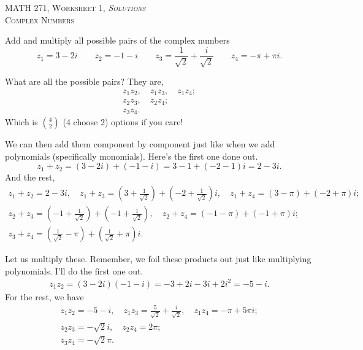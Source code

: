 \documentclass[12pt]{article} %
\begin{document}
\begin{center}
   \textsc{\large MATH 271, Worksheet 1, \emph{Solutions}}\\
   \textsc{Complex Numbers}
\end{center}
\vspace{.5cm}

\begin{problem}
Add and multiply all possible pairs of the complex numbers
\[
z_1 = 3-2i \qquad z_2 = -1-i \qquad z_3 = \frac{1}{\sqrt{2}}+\frac{i}{\sqrt{2}} \qquad z_4 = -\pi + \pi i.
\]
\end{problem}
\begin{solution}
What are all the possible pairs? They are,
\begin{align*}
    z_1 z_2, \quad z_1 z_3, \quad z_1 z_4;\\
    z_2 z_3, \quad z_2 z_4;\\
    z_3 z_4.
\end{align*}
Which is $\binom{4}{2}$ (4 choose 2) options if you care!

We can then add them component by component just like when we add polynomials (specifically monomials). Here's the first one done out.
\[
z_1+z_2=(3-2i)+(-1-i)=3-1+(-2-1)i=2-3i.
\]
And the rest,
\begin{align*}
    z_1 + z_2=2-3i, \quad z_1 + z_3=\left(3+\frac{1}{\sqrt{2}}\right)+\left(-2+\frac{1}{\sqrt{2}}\right)i, \quad z_1 + z_4=(3-\pi)+(-2+\pi)i;\\
    z_2+ z_3= \left(-1+\frac{1}{\sqrt{2}}\right) + \left(-1+\frac{1}{\sqrt{2}}\right), \quad z_2 + z_4 = (-1-\pi)+(-1+\pi)i;\\
    z_3+z_4=\left(\frac{1}{\sqrt{2}}-\pi\right)+\left(\frac{1}{\sqrt{2}}+\pi\right)i.
\end{align*}

Let us multiply these. Remember, we foil these products out just like multiplying polynomials. I'll do the first one out.
\begin{align*}
    z_1z_2 = (3-2i)(-1-i)=-3+2i-3i+2i^2=-5 -i.
\end{align*}
For the rest, we have
\begin{align*}
    z_1 z_2= -5-i, \quad z_1 z_3=\frac{5}{\sqrt{2}}+\frac{i}{\sqrt{2}}, \quad z_1 z_4=-\pi +5\pi i;\\
    z_2 z_3=-\sqrt{2}i, \quad z_2 z_4=2\pi;\\
    z_3 z_4=-\sqrt{2}\pi.
\end{align*}
\end{solution}
\end{document}

